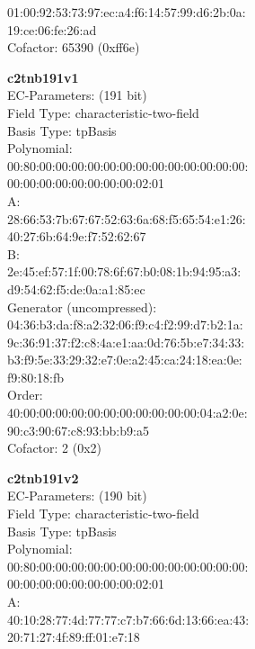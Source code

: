     01:00:92:53:73:97:ec:a4:f6:14:57:99:d6:2b:0a:\\
    19:ce:06:fe:26:ad\\
Cofactor:  65390 (0xff6e)\\
\item \textbf{ c2tnb191v1 }\\
EC-Parameters: (191 bit)\\
Field Type: characteristic-two-field\\
Basis Type: tpBasis\\
Polynomial:\\
    00:80:00:00:00:00:00:00:00:00:00:00:00:00:00:\\
    00:00:00:00:00:00:00:00:02:01\\
A:   \\
    28:66:53:7b:67:67:52:63:6a:68:f5:65:54:e1:26:\\
    40:27:6b:64:9e:f7:52:62:67\\
B:   \\
    2e:45:ef:57:1f:00:78:6f:67:b0:08:1b:94:95:a3:\\
    d9:54:62:f5:de:0a:a1:85:ec\\
Generator (uncompressed):\\
    04:36:b3:da:f8:a2:32:06:f9:c4:f2:99:d7:b2:1a:\\
    9c:36:91:37:f2:c8:4a:e1:aa:0d:76:5b:e7:34:33:\\
    b3:f9:5e:33:29:32:e7:0e:a2:45:ca:24:18:ea:0e:\\
    f9:80:18:fb\\
Order: \\
    40:00:00:00:00:00:00:00:00:00:00:00:04:a2:0e:\\
    90:c3:90:67:c8:93:bb:b9:a5\\
Cofactor:  2 (0x2)\\
\item \textbf{ c2tnb191v2 }\\
EC-Parameters: (190 bit)\\
Field Type: characteristic-two-field\\
Basis Type: tpBasis\\
Polynomial:\\
    00:80:00:00:00:00:00:00:00:00:00:00:00:00:00:\\
    00:00:00:00:00:00:00:00:02:01\\
A:   \\
    40:10:28:77:4d:77:77:c7:b7:66:6d:13:66:ea:43:\\
    20:71:27:4f:89:ff:01:e7:18\\
